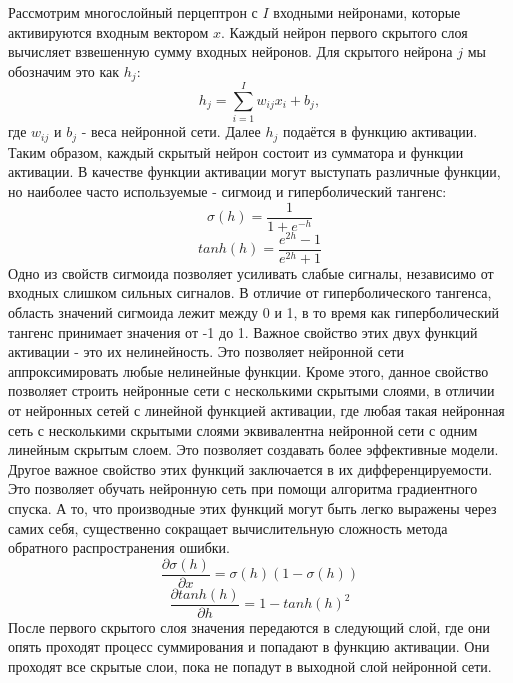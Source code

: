     Рассмотрим многослойный перцептрон с $I$ входными нейронами, которые активируются входным вектором $x$. Каждый нейрон первого скрытого слоя вычисляет взвешенную сумму входных нейронов. Для скрытого нейрона $j$ мы обозначим это как $h_{j}$:
    \begin{equation}
    h_{j}=\sum_{i=1}^{I}w_{ij}x_{i} + b_{j} ,
    \end{equation}
    где $w_{ij}$ и $b_{j}$ - веса нейронной сети. Далее $h_{j}$ подаётся в функцию активации. Таким образом, каждый скрытый нейрон состоит из сумматора и функции активации. В качестве функции активации могут выступать различные функции, но наиболее часто используемые - сигмоид и гиперболический тангенс:
    \begin{equation}
    \sigma(h) = \frac{1}{1+e^{-h}}
    \end{equation}
    \begin{equation}
    tanh(h) = \frac{e^{2h}-1}{e^{2h}+1}
    \end{equation}
    Одно из свойств сигмоида позволяет усиливать слабые сигналы, независимо от входных слишком сильных сигналов. В отличие от гиперболического тангенса, область значений сигмоида лежит между 0 и 1, в то время как гиперболический тангенс принимает значения от -1 до 1. Важное свойство этих двух функций активации - это их нелинейность. Это позволяет нейронной сети аппроксимировать любые нелинейные функции. Кроме этого, данное свойство позволяет строить нейронные сети с несколькими скрытыми слоями, в отличии от нейронных сетей с линейной функцией активации, где любая такая нейронная сеть с несколькими скрытыми слоями эквивалентна нейронной сети с одним линейным скрытым слоем. Это позволяет создавать более эффективные модели.
    Другое важное свойство этих функций заключается в их дифференцируемости. Это позволяет обучать нейронную сеть при помощи алгоритма градиентного спуска. А то, что производные этих функций могут быть легко выражены через самих себя, существенно сокращает вычислительную сложность метода обратного распространения ошибки.
    \begin{equation}
    \frac{\partial \sigma (h)}{\partial x} = \sigma (h)(1 - \sigma (h))
    \end{equation}
    \begin{equation}
    \frac{\partial tanh(h)}{\partial h} = 1 - tanh(h)^2
    \end{equation}
    После первого скрытого слоя значения передаются в следующий слой, где они опять проходят процесс суммирования и попадают в функцию активации. Они проходят все скрытые слои, пока не попадут в выходной слой нейронной сети.

